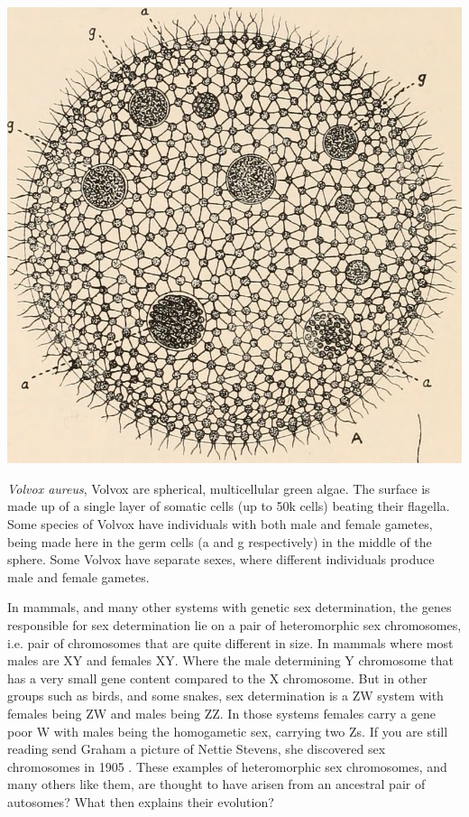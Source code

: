   \begin{marginfigure}[-3cm]
\begin{center}
\includegraphics[width = \textwidth]{illustration_images/multiple_sel_loci/volvox/volvox.jpg}
\end{center}
\caption{ {\it Volvox aureus}, Volvox are spherical, multicellular green algae. The surface is made up of a single layer of somatic cells (up to 50k cells) beating their flagella. Some species of Volvox have individuals with both male and female gametes, being made here in the germ cells (a and g respectively) in the middle of the sphere. Some Volvox have separate sexes, where different individuals produce male and female gametes.}
\end{marginfigure}
In mammals, and many other systems with genetic sex determination, the genes responsible for sex determination lie on a pair of heteromorphic sex chromosomes, i.e. pair of chromosomes that are quite different in size. In mammals where most males are XY and females XY. Where the male determining Y chromosome that has a very small gene content compared to the X chromosome. But in other groups such as birds, and some snakes, sex determination is a ZW system with females being ZW and males being ZZ. In those systems females carry a gene poor W with males being the homogametic sex, carrying two Zs.  If you are still reading send Graham a picture of Nettie Stevens, she discovered sex chromosomes in 1905 \citep{stevens1905studies}. These examples of heteromorphic sex chromosomes, and many others like them, are thought to have arisen from an ancestral pair of autosomes? What then explains their evolution? %

